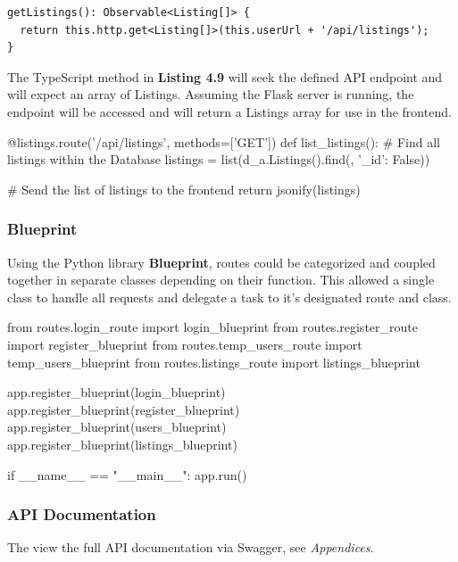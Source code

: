 \begin{lstlisting}[caption=Basic Request to the API]
getListings(): Observable<Listing[]> {
  return this.http.get<Listing[]>(this.userUrl + '/api/listings');
}
\end{lstlisting}

The TypeScript method in \textbf{Listing 4.9} will seek the defined API endpoint and will expect an array of Listings. Assuming the Flask server is running, the endpoint will be accessed and will return a Listings array for use in the frontend. \newline

\begin{python}[caption=API Counterpart Route]
@listings.route('/api/listings', methods=['GET'])
def list_listings():
    # Find all listings within the Database
    listings = list(d_a.Listings().find({}, {'_id': False}))
    
    # Send the list of listings to the frontend
    return jsonify(listings)
\end{python}

\subsubsection{Blueprint}
Using the Python library \textbf{Blueprint}, routes could be categorized and coupled together in separate classes depending on their function. This allowed a single class to handle all requests and delegate a task to it's designated route and class. \newline

\begin{python}[caption=Main Flask Runner]
from routes.login_route import login_blueprint 
from routes.register_route import register_blueprint
from routes.temp_users_route import temp_users_blueprint
from routes.listings_route import listings_blueprint

app.register_blueprint(login_blueprint) 
app.register_blueprint(register_blueprint)
app.register_blueprint(users_blueprint)
app.register_blueprint(listings_blueprint)

if __name__ == "__main__":
    app.run() 
\end{python}

\subsubsection{API Documentation}
The view the full API documentation via Swagger, see \textit{Appendices}. 

